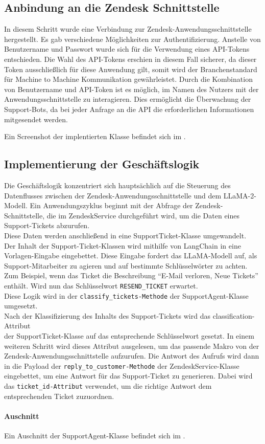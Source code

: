 \subsection{Anbindung an die Zendesk Schnittstelle}
\label{sec:ImplementierungBenutzeroberflaeche}
In diesem Schritt wurde eine Verbindung zur Zendesk-Anwendungsschnittstelle hergestellt.
Es gab verschiedene Möglichkeiten zur Authentifizierung. 
Anstelle von Benutzername und Passwort wurde sich für die Verwendung eines \ac{API}-Tokens entschieden.
Die Wahl des \ac{API}-Tokens erschien in diesem Fall sicherer, da dieser Token ausschließlich
für diese Anwendung gilt, somit wird der Branchenstandard für Machine to Machine Kommunikation gewährleistet.
Durch die Kombination von Benutzername und \ac{API}-Token ist es möglich, im Namen des Nutzers mit der 
Anwendungsschnittstelle zu interagieren. Dies ermöglicht die 
Überwachung der Support-Bots, da bei jeder Anfrage an die \ac{API} die
erforderlichen Informationen mitgesendet werden.

Ein Screenshot der implentierten Klasse befindet sich im .

\subsection{Implementierung der Geschäftslogik}
\label{sec:ImplementierungGeschaeftslogik}
Die Geschäftslogik konzentriert sich hauptsächlich auf die Steuerung des Datenflusses
zwischen der Zendesk-Anwendungsschnittstelle und dem \ac{LLaMA}-2-Modell.
Ein Anwendungszyklus beginnt mit der Abfrage der Zendesk-Schnittstelle, 
die im ZendeskService durchgeführt wird, um die Daten eines Support-Tickets abzurufen. ~\\
Diese Daten werden anschließend in eine SupportTicket-Klasse umgewandelt. ~\\
Der Inhalt der Support-Ticket-Klassen wird mithilfe von LangChain 
in eine Vorlagen-Eingabe eingebettet. Diese Eingabe fordert das \ac{LLaMA}-Modell auf, 
als Support-Mitarbeiter zu agieren und auf bestimmte Schlüsselwörter zu achten.
Zum Beispiel, wenn das Ticket die Beschreibung ``E-Mail verloren, Neue Tickets'' enthält.
Wird nun das Schlüsselwort \texttt{RESEND\_TICKET} erwartet. ~\\ Diese Logik wird in der 
\texttt{classify\_tickets-Methode} der SupportAgent-Klasse umgesetzt. ~\\
Nach der Klassifizierung des Inhalts des Support-Tickets wird das
classification-Attribut ~\\ der SupportTicket-Klasse auf das entsprechende Schlüsselwort 
gesetzt. In einem weiteren Schritt wird dieses Attribut ausgelesen, 
um das passende Makro von der Zendesk-Anwendungsschnittstelle aufzurufen. 
Die Antwort des Aufrufs wird dann in die Payload der \texttt{reply\_to\_customer-Methode}
der ZendeskService-Klasse eingebettet, um eine Antwort für das Support-Ticket
zu generieren. Dabei wird das \texttt{ticket\_id-Attribut} verwendet, 
um die richtige Antwort dem entsprechenden Ticket zuzuordnen.

\paragraph{Auschnitt}
Ein Auschnitt der SupportAgent-Klasse befindet sich im .
